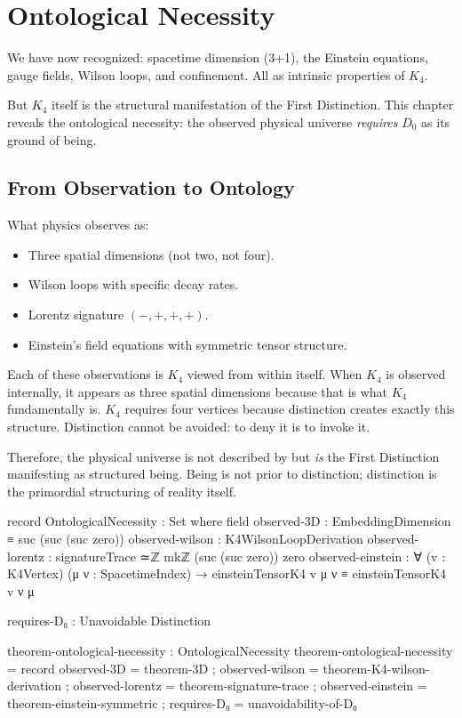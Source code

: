 \documentclass[11pt,a4paper]{book}
\begin{document}
\chapter{Ontological Necessity}

We have now recognized: spacetime dimension (3+1), the Einstein equations, gauge fields, 
Wilson loops, and confinement. All as intrinsic properties of $K_4$.

But $K_4$ itself is the structural manifestation of the First Distinction. This chapter reveals the ontological necessity: the observed physical universe \emph{requires} $D_0$ as its ground of being.

\section{From Observation to Ontology}

What physics observes as:
\begin{itemize}
\item Three spatial dimensions (not two, not four).
\item Wilson loops with specific decay rates.
\item Lorentz signature $(-,+,+,+)$.
\item Einstein's field equations with symmetric tensor structure.
\end{itemize}

Each of these observations is $K_4$ viewed from within itself. When $K_4$ is observed internally, it appears as three spatial dimensions because that is what $K_4$ fundamentally is. $K_4$ requires four vertices because distinction creates exactly this structure. Distinction cannot be avoided: to deny it is to invoke it.

Therefore, the physical universe is not described by but \emph{is} the First Distinction manifesting as structured being. Being is not prior to distinction; distinction is the primordial structuring of reality itself.

\begin{code}
record OntologicalNecessity : Set where
  field
    observed-3D          : EmbeddingDimension ≡ suc (suc (suc zero))
    observed-wilson      : K4WilsonLoopDerivation
    observed-lorentz     : signatureTrace ≃ℤ mkℤ (suc (suc zero)) zero
    observed-einstein    : ∀ (v : K4Vertex) (μ ν : SpacetimeIndex) → 
                           einsteinTensorK4 v μ ν ≡ einsteinTensorK4 v ν μ
    
    requires-D₀ : Unavoidable Distinction

theorem-ontological-necessity : OntologicalNecessity
theorem-ontological-necessity = record
  { observed-3D          = theorem-3D
  ; observed-wilson      = theorem-K4-wilson-derivation
  ; observed-lorentz     = theorem-signature-trace
  ; observed-einstein    = theorem-einstein-symmetric
  ; requires-D₀          = unavoidability-of-D₀
  }
\end{code}
\end{document}
